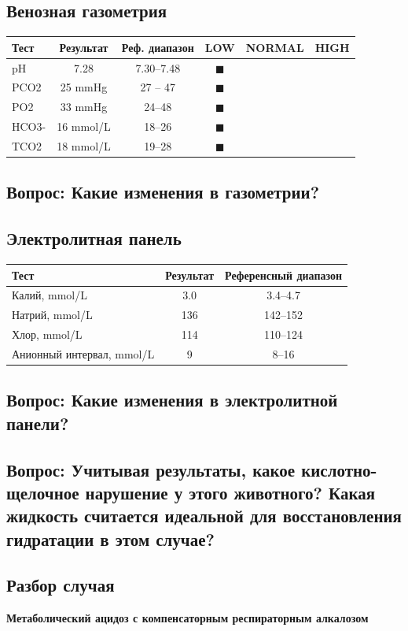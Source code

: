 \documentclass[a4paper,12pt]{book}
\begin{document}
\subsection*{Венозная газометрия}
\begin{tabular}{lccccc}
\toprule
Тест & Результат & Реф. диапазон & LOW & NORMAL & HIGH \\
\midrule
pH & 7.28 & 7.30--7.48 & $\blacksquare$ \\
PCO2 & 25 mmHg & 27 -- 47 & $\blacksquare$ \\
PO2 & 33 mmHg & 24--48 & $\blacksquare$ \\
HCO3- & 16 mmol/L & 18--26 & $\blacksquare$ \\
TCO2 & 18 mmol/L & 19--28 & $\blacksquare$ \\
\bottomrule
\end{tabular}

\subsection*{Вопрос: Какие изменения в газометрии?}

\subsection*{Электролитная панель}
\begin{tabular}{lcc}
\toprule
Тест & Результат & Референсный диапазон \\
\midrule
Калий, mmol/L & 3.0 & 3.4--4.7 \\
Натрий, mmol/L & 136 & 142--152 \\
Хлор, mmol/L & 114 & 110--124 \\
Анионный интервал, mmol/L & 9 & 8--16 \\
\bottomrule
\end{tabular}

\subsection*{Вопрос: Какие изменения в электролитной панели?}
\subsection*{Вопрос: Учитывая результаты, какое кислотно-щелочное нарушение у этого животного? Какая жидкость считается идеальной для восстановления гидратации в этом случае?}

\subsection*{Разбор случая}
\textbf{Метаболический ацидоз с компенсаторным респираторным алкалозом}
\end{document}
